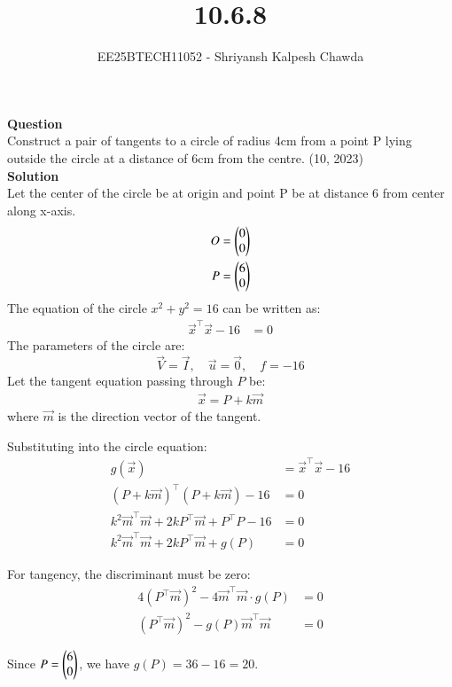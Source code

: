 \documentclass[article]{IEEEtran}
\begin{document}
	\title{10.6.8}
	\author{EE25BTECH11052 - Shriyansh Kalpesh Chawda}
	\maketitle
	\textbf{Question}\\
	Construct a pair of tangents to a circle of radius 4cm from a point P lying outside the circle at 
	a distance of 6cm from the centre.
	\hfill{(10, 2023)}\\
	
	\textbf{Solution}\\
	Let the center of the circle be at origin and point P be at distance 6 from center along x-axis.
	\begin{align}
		O &= \begin{pmatrix}0\\0\end{pmatrix}\\
		P &= \begin{pmatrix}6\\0\end{pmatrix}
	\end{align}
	The equation of the circle $x^2 + y^2 = 16$ can be written as:
	\begin{align}
		\vec{x}^\top \vec{x} - 16 &= 0
	\end{align}
	The parameters of the circle are:
	\begin{equation}
		\vec{V} = \vec{I}, \quad \vec{u} = \vec{0}, \quad f = -16
	\end{equation}
	Let the tangent equation passing through $P$ be:
	\begin{align}
		\vec{x} = P + k\vec{m}
	\end{align}
	where $\vec{m}$ is the direction vector of the tangent.
	
	Substituting into the circle equation:
	\begin{align}
		g(\vec{x}) &= \vec{x}^\top\vec{x} - 16\\
		(P + k\vec{m})^\top(P + k\vec{m}) - 16 &= 0\\
		k^2\vec{m}^\top\vec{m} + 2kP^\top\vec{m} + P^\top P - 16 &= 0\\
		k^2\vec{m}^\top\vec{m} + 2kP^\top\vec{m} + g(P) &= 0
	\end{align}
	
	For tangency, the discriminant must be zero:
	\begin{align}
		4(P^\top\vec{m})^2 - 4\vec{m}^\top\vec{m} \cdot g(P) &= 0\\
		(P^\top\vec{m})^2 - g(P)\vec{m}^\top\vec{m} &= 0
	\end{align}
	
	Since $P = \begin{pmatrix}6\\0\end{pmatrix}$, we have $g(P) = 36 - 16 = 20$.
	
\end{document}
